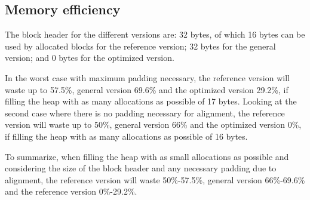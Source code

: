 
\subsection{Memory efficiency}

The block header for the different versions are: 32 bytes, of which 16 bytes can be used by allocated blocks for the reference version; 32 bytes for the general version; and 0 bytes for the optimized version. 

In the worst case with maximum padding necessary, the reference version will waste up to 57.5\%, general version 69.6\% and the optimized version 29.2\%, if filling the heap with as many allocations as possible of 17 bytes. Looking at the second case where there is no padding necessary for alignment, the reference version will waste up to 50\%, general version 66\% and the optimized version 0\%, if filling the heap with as many allocations as possible of 16 bytes.

To summarize, when filling the heap with as small allocations as possible and considering the size of the block header and any necessary padding due to alignment, the reference version will waste 50\%-57.5\%, general version 66\%-69.6\% and the reference version 0\%-29.2\%.








